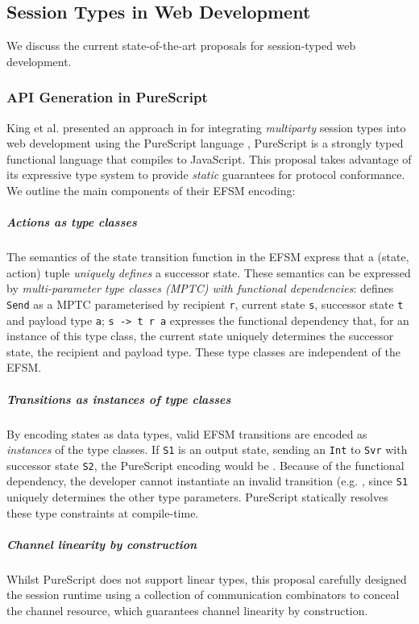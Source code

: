 \subsection{Session Types in Web Development}
\label{subsection:sessiontypewebdev}

We discuss the current state-of-the-art proposals
for session-typed web development.

\subsubsection{API Generation in PureScript}
King et al. presented an approach in \cite{PureScript2019}
for integrating \textit{multiparty} session types 
into web development using 
the PureScript language \cite{PureScript},
PureScript is a strongly typed functional language
that compiles to JavaScript.
This proposal takes advantage of its expressive type system to 
provide \textit{static} guarantees for protocol conformance.
We outline the main components of their EFSM encoding:

\subparagraph{Actions as type classes} 
The semantics of the state transition function 
in the EFSM express that a (state, action) tuple
\textit{uniquely defines} a successor state. 
These semantics can be expressed by 
\textit{multi-parameter type classes (MPTC) 
with functional dependencies}: 
defines \texttt{Send} as a MPTC 
parameterised by recipient \texttt{r}, 
current state \texttt{s}, successor state \texttt{t} 
and payload type \texttt{a}; 
\texttt{s -> t r a} expresses the functional dependency that, 
for an instance of this type class, 
the current state uniquely determines the
successor state, the recipient and payload type. 
These type classes are independent of the EFSM.

\subparagraph{Transitions as instances of type classes} 
By encoding states as data types, 
valid EFSM transitions are encoded as 
\textit{instances} of the type classes. 
If \texttt{S1} is an output state, 
sending an \texttt{Int} to \texttt{Svr} with 
successor state \texttt{S2}, the PureScript encoding would be
.
Because of the functional dependency, 
the developer cannot instantiate an invalid transition 
(e.g. , 
since \texttt{S1} uniquely determines the other type parameters. 
PureScript statically resolves these type constraints at
compile-time.

\subparagraph{Channel linearity by construction}
Whilst PureScript does not support linear types,
this proposal carefully designed the session runtime using 
a collection of communication combinators to conceal the
channel resource, which guarantees channel linearity by construction.\\

